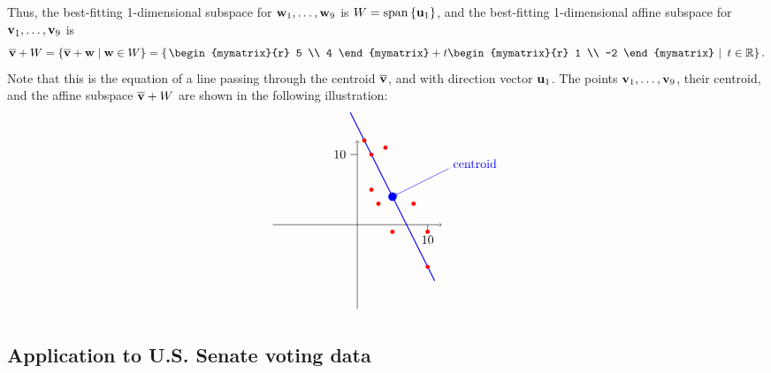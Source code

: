 \begin{solution}
  Thus, the best-fitting 1-dimensional subspace for
  $\vect{w}_1,\ldots,\vect{w}_9$ is $W = \sspan\set{\vect{u}_1}$, and
  the best-fitting 1-dimensional affine subspace for
  $\vect{v}_1,\ldots,\vect{v}_9$ is
  \begin{equation*}
    \centroid{\vect{v}} + W
    = \set{\centroid{\vect{v}} + \vect{w} \mid \vect{w}\in W}
    = \set{\left.\begin{mymatrix}{r} 5 \\ 4 \end{mymatrix} +
      t\begin{mymatrix}{r} 1 \\ -2 \end{mymatrix} ~\right\vert~ t\in\R}.
  \end{equation*}
  Note that this is the equation of a line passing through the
  centroid $\centroid{\vect{v}}$, and with direction vector
  $\vect{u}_1$. The points $\vect{v}_1,\ldots,\vect{v}_9$, their
  centroid, and the affine subspace $\centroid{\vect{v}} + W$ are
  shown in the following illustration:
  \begin{equation*}
    \begin{tikzpicture}[scale=0.2]
      \draw[thin,->] (-12,0) -- (12,0);
      \draw[thin,->] (0,-12) -- (0,12);
      \draw[thin] (0,10) -- (-1,10) node[left] {$10$};
      \draw[thin] (10,0) -- (10,-1) node[below] {$10$};
      \draw[thick,blue] (5,4) +(-6,12) -- +(6,-12);
      \fill[color=blue] (5,4) circle (0.6);
      \draw[blue, ->] (5,4) +(8,4) node[right,yshift=4] {centroid} -- +(0.4,0.2);
      \fill[color=red] (10, -6) circle (0.3);
      \fill[color=red] (10, -1) circle (0.3);
      \fill[color=red] (5, -1) circle (0.3);
      \fill[color=red] (8, 3) circle (0.3);
      \fill[color=red] (3, 3) circle (0.3);
      \fill[color=red] (2, 5) circle (0.3);
      \fill[color=red] (2, 10) circle (0.3);
      \fill[color=red] (4, 11) circle (0.3);
      \fill[color=red] (1, 12) circle (0.3);
    \end{tikzpicture}
  \end{equation*}
  \vspace{-4ex}\par  
\end{solution}

\subsection*{Application to U.S. Senate voting data}

